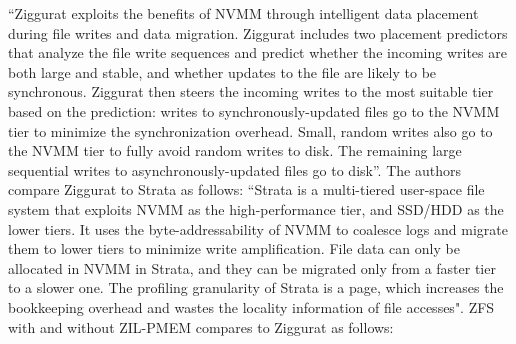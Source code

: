 \documentclass[12pt,a4paper,twoside]{book}
\begin{document}
“Ziggurat exploits the benefits of NVMM through intelligent data placement during file writes and data migration.
Ziggurat includes two placement predictors that analyze the file write sequences and predict whether the incoming writes are both large and stable, and whether updates to the file are likely to be synchronous.
Ziggurat then steers the incoming writes to the most suitable tier based on the prediction: writes to synchronously-updated files go to the NVMM tier to minimize the synchronization overhead.
Small, random writes also go to the NVMM tier to fully avoid random writes to disk. The remaining large sequential writes to asynchronously-updated files go to disk”.
The authors compare Ziggurat to Strata as follows:
“Strata is a multi-tiered user-space file system that exploits NVMM as the high-performance tier, and SSD/HDD as the lower tiers.
It uses the byte-addressability of NVMM to coalesce logs and migrate them to lower tiers to minimize write amplification.
File data can only be allocated in NVMM in Strata, and they can be migrated only from a faster tier to a slower one.
The profiling granularity of Strata is a page, which increases the bookkeeping overhead and wastes the locality information of file accesses".
ZFS with and without ZIL-PMEM compares to Ziggurat as follows:
\end{document}
